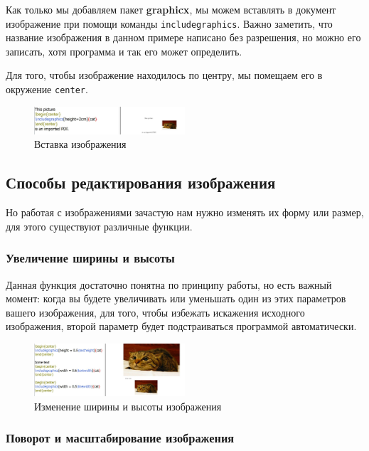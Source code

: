 \documentclass[a4paper,12pt]{article}
\begin{document}
Как только мы добавляем пакет \textbf{graphicx}, мы можем вставлять в документ изображение при помощи команды \texttt{includegraphics}. Важно заметить, что название изображения в данном примере написано без разрешения, но можно его записать, хотя программа и так его может определить.

Для того, чтобы изображение находилось по центру, мы помещаем его в окружение \texttt{center}.

\begin{figure}[h]
\centering
\includegraphics[width=0.5\textwidth]{1.JPG}
\caption{Вставка изображения}
\label{fig:insert_image}
\end{figure}

\subsection{Способы редактирования изображения}

Но работая с изображениями зачастую нам нужно изменять их форму или размер, для этого существуют различные функции.

\subsubsection{Увеличение ширины и высоты}

Данная функция достаточно понятна по принципу работы, но есть важный момент: когда вы будете увеличивать или уменьшать один из этих параметров вашего изображения, для того, чтобы избежать искажения исходного изображения, второй параметр будет подстраиваться программой автоматически.

\begin{figure}[h]
\centering
\includegraphics[width=0.5\textwidth]{2.JPG}
\caption{Изменение ширины и высоты изображения}
\label{fig:width_height}
\end{figure}

\subsubsection{Поворот и масштабирование изображения}
\end{document}
